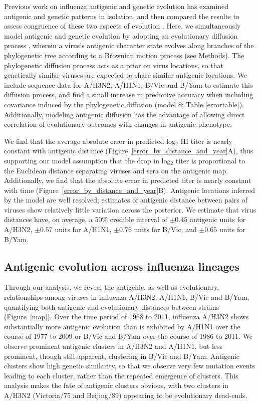 \documentclass[11pt,oneside,letterpaper]{article}
\begin{document}
Previous work on influenza antigenic and genetic evolution has examined antigenic and genetic patterns in isolation, and then compared the results to assess congruence of these two aspects of evolution \cite{Hay01,Smith04,Russell08}. 
Here, we simultaneously model antigenic and genetic evolution by adopting an evolutionary diffusion process \cite{Lemey10}, wherein a virus's antigenic character state evolves along branches of the phylogenetic tree according to a Brownian motion process (see Methods).
The phylogenetic diffusion process acts as a prior on virus locations, so that genetically similar viruses are expected to share similar antigenic locations.
We include sequence data for A/H3N2, A/H1N1, B/Vic and B/Yam to estimate this diffusion process, and find a small increase in predictive accuracy when including covariance induced by the phylogenetic diffusion (model 8; Table \ref{errortable}).
Additionally, modeling antigenic diffusion has the advantage of allowing direct correlation of evolutionary outcomes with changes in antigenic phenotype.

We find that the average absolute error in predicted log$_2$ HI titer is nearly constant with antigenic distance (Figure~\ref{error_by_distance_and_year}A), thus supporting our model assumption that the drop in log$_2$ titer is proportional to the Euclidean distance separating viruses and sera on the antigenic map.
Additionally, we find that the absolute error in predicted titer is nearly constant with time (Figure~\ref{error_by_distance_and_year}B).
Antigenic locations inferred by the model are well resolved; estimates of antigenic distance between pairs of viruses show relatively little variation across the posterior.
We estimate that virus distances have, on average, a 50\% credible interval of $\pm0.45$ antigenic units for A/H3N2, $\pm0.57$ units for A/H1N1, $\pm0.76$ units for B/Vic, and $\pm0.65$ units for B/Yam.

\subsection*{Antigenic evolution across influenza lineages}

Through our analysis, we reveal the antigenic, as well as evolutionary, relationships among viruses in influenza A/H3N2, A/H1N1, B/Vic and B/Yam, quantifying both antigenic and evolutionary distances between strains (Figure~\ref{map}).
Over the time period of 1968 to 2011, influenza A/H3N2 shows substantially more antigenic evolution than is exhibited by A/H1N1 over the course of 1977 to 2009 or B/Vic and B/Yam over the course of 1986 to 2011.
We observe prominent antigenic clusters in A/H3N2 and A/H1N1, but less prominent, though still apparent, clustering in B/Vic and B/Yam.
Antigenic clusters show high genetic similarity, so that we observe very few mutation events leading to each cluster, rather than the repeated emergence of clusters.
This analysis makes the fate of antigenic clusters obvious, with two clusters in A/H3N2 (Victoria/75 and Beijing/89) appearing to be evolutionary dead-ends.
\end{document}
